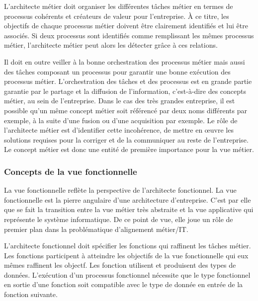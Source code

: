     L'architecte métier doit organiser les différentes tâches métier en
    termes de processus cohérents et créateurs de valeur pour l'entreprise. À ce titre, les objectifs de chaque processus
    métier doivent être clairement identifiés et lui être associés. 
    Si deux processus sont identifiés comme remplissant les mêmes processus métier, l'architecte métier
    peut alors les détecter grâce à ces relations.

    Il doit en outre veiller à la bonne orchestration des processus métier
    mais aussi des tâches composant un processus pour garantir une bonne exécution des processus métier.
    L'orchestration des tâches et des processus est en grande partie garantie par le partage
    et la diffusion de l'information, c'est-à-dire des concepts métier, au sein de l'entreprise.
    Dans le cas des très grandes entreprise, il est possible qu'un même concept métier
    soit référencé par deux noms différents par exemple, à la suite d'une fusion ou d'une acquisition par exemple.
    Le rôle de l'architecte métier est d'identifier cette incohérence, de mettre en œuvre les solutions requises pour
    la corriger et de la communiquer au reste de l'entreprise.
    Le concept métier est donc une entité de première importance pour la vue métier.

    \subsubsection{Concepts de la vue fonctionnelle}
    La vue fonctionnelle reflète la perspective de l'architecte fonctionnel.
    La vue fonctionnelle est la pierre angulaire d'une architecture d'entreprise. C'est par elle que se fait la transition
    entre la vue métier très abstraite et la vue applicative qui représente le système informatique. De ce point de vue,
    elle joue un rôle de premier plan dans la problématique d'alignement métier/IT.

    L'architecte fonctionnel doit spécifier les fonctions qui raffinent les tâches métier.
    Les fonctions participent à atteindre les objectifs de la vue fonctionnelle qui eux mêmes raffinent les objectf. 
    Les fonction utilisent et produisent des types de données. L'exécution d'un processus fonctionnel
    nécessite que le type fonctionnel en sortie d'une fonction soit compatible avec le type de donnée
    en entrée de la fonction suivante.

